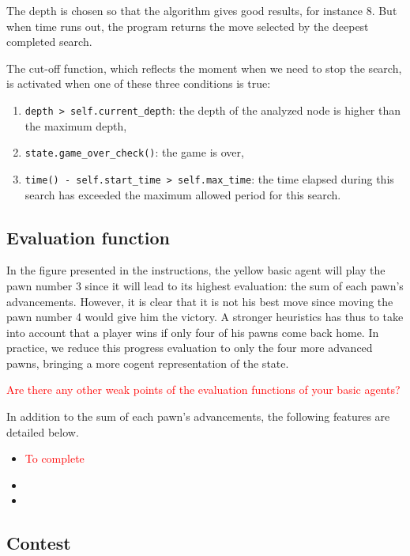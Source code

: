 \documentclass[en]{article}
\newcommand{\py}[1]{\texttt{#1}}
\begin{document}
The depth is chosen so that the algorithm gives good results, for instance 8. But when time runs out, the program returns the move selected by the deepest completed search.

The cut-off function, which reflects the moment when we need to stop the search, is activated when one of these three conditions is true:

\begin{enumerate}
 \item \py{depth > self.current_depth}: the depth of the analyzed node is higher than the maximum depth,
 \item \py{state.game_over_check()}: the game is over,
 \item \py{time() - self.start_time > self.max_time}: the time elapsed during this search has exceeded the maximum allowed period for this search.
\end{enumerate}

\subsection{Evaluation function}

In the figure presented in the instructions, the yellow basic agent will play the pawn number 3 since it will lead to its highest evaluation: the sum of each pawn’s advancements. However, it is clear that it is not his best move since moving the pawn number 4 would give him the victory. A stronger heuristics has thus to take into account that a player wins if only four of his pawns come back home. In practice, we reduce this progress evaluation to only the four more advanced pawns, bringing a more cogent representation of the state.

\textcolor{red}{Are there any other weak points of the evaluation functions of your basic agents?}

In addition to the sum of each pawn’s advancements, the following features are detailed below.

\begin{itemize}
 \item \textcolor{red}{To complete}
 \item 
 \item 
\end{itemize}



\subsection{Contest}



\end{document}
